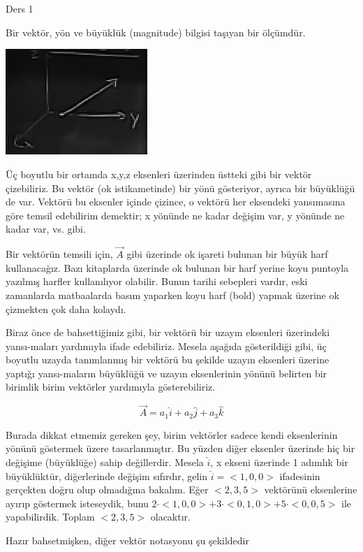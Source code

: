 \documentclass[12pt,fleqn]{article}\usepackage{../../common}
\begin{document}
Ders 1

Bir vektör, yön ve büyüklük (magnitude) bilgisi taşıyan bir ölçümdür.

\includegraphics[height=4cm]{1_1.png}

Üç boyutlu bir ortamda x,y,z eksenleri üzerinden üstteki gibi bir vektör
çizebiliriz. Bu vektör (ok istikametinde) bir yönü gösteriyor, ayrıca bir
büyüklüğü de var. Vektörü bu eksenler içinde çizince, o vektörü her
eksendeki yansımasına göre temsil edebilirim demektir; x yönünde ne kadar
değişim var, y yönünde ne kadar var, vs. gibi.

Bir vektörün temsili için, $\vec{A}$ gibi üzerinde ok işareti bulunan bir büyük
harf kullanacağız. Bazı kitaplarda üzerinde ok bulunan bir harf yerine koyu
puntoyla yazılmış harfler kullanılıyor olabilir. Bunun tarihi sebepleri vardır,
eski zamanlarda matbaalarda basım yaparken koyu harf (bold) yapmak üzerine ok
çizmekten çok daha kolaydı.

Biraz önce de bahsettiğimiz gibi, bir vektörü bir uzayın eksenleri üzerindeki
yansı-maları yardımıyla ifade edebiliriz. Mesela aşağıda gösterildiği gibi, üç
boyutlu uzayda tanımlanmış bir vektörü bu şekilde uzayın eksenleri üzerine
yaptığı yansı-maların büyüklüğü ve uzayın eksenlerinin yönünü belirten bir
birimlik birim vektörler yardımıyla gösterebiliriz.

$$ \vec{A} = a_1 \hat{i} + a_2 \hat{j} + a_3 \hat{k} $$

Burada dikkat etmemiz gereken şey, birim vektörler sadece kendi eksenlerinin
yönünü göstermek üzere tasarlanmıştır. Bu yüzden diğer eksenler üzerinde hiç bir
değişime (büyüklüğe) sahip değillerdir. Mesela $\hat{i}$, x ekseni üzerinde 1
adımlık bir büyüklüktür, diğerlerinde değişim sıfırdır, gelin $\hat{i} = < 1,0,0 >$
ifadesinin gerçekten doğru olup olmadığına bakalım. Eğer $< 2,3,5 >$
vektörünü eksenlerine ayırıp göstermek isteseydik, bunu $2\cdot< 1,0,0 > +
3\cdot< 0,1,0 > + 5\cdot< 0,0,5 >$ ile yapabilirdik. Toplam $< 2,3,5 >$ olacaktır.

Hazır bahsetmişken, diğer vektör notasyonu şu şekildedir
\end{document}
